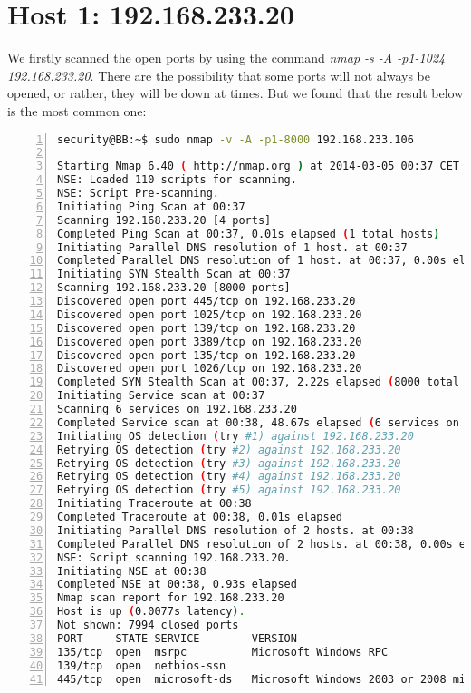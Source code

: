\section*{Host 1: 192.168.233.20}
\par We firstly scanned the open ports by using the command \textit{nmap -s -A -p1-1024 192.168.233.20}. There are the possibility that some ports will not always be opened, or rather, they will be down at times. But we found that the result below is the most common one:
\par \begin{lstlisting}[language=sh,numbers=left,numberstyle=\tiny,columns=fullflexible,basicstyle=\footnotesize\ttfamily, breaklines=true, breakautoindent=true, breakindent=4em]
security@BB:~$ sudo nmap -v -A -p1-8000 192.168.233.106

Starting Nmap 6.40 ( http://nmap.org ) at 2014-03-05 00:37 CET
NSE: Loaded 110 scripts for scanning.
NSE: Script Pre-scanning.
Initiating Ping Scan at 00:37
Scanning 192.168.233.20 [4 ports]
Completed Ping Scan at 00:37, 0.01s elapsed (1 total hosts)
Initiating Parallel DNS resolution of 1 host. at 00:37
Completed Parallel DNS resolution of 1 host. at 00:37, 0.00s elapsed
Initiating SYN Stealth Scan at 00:37
Scanning 192.168.233.20 [8000 ports]
Discovered open port 445/tcp on 192.168.233.20
Discovered open port 1025/tcp on 192.168.233.20
Discovered open port 139/tcp on 192.168.233.20
Discovered open port 3389/tcp on 192.168.233.20
Discovered open port 135/tcp on 192.168.233.20
Discovered open port 1026/tcp on 192.168.233.20
Completed SYN Stealth Scan at 00:37, 2.22s elapsed (8000 total ports)
Initiating Service scan at 00:37
Scanning 6 services on 192.168.233.20
Completed Service scan at 00:38, 48.67s elapsed (6 services on 1 host)
Initiating OS detection (try #1) against 192.168.233.20
Retrying OS detection (try #2) against 192.168.233.20
Retrying OS detection (try #3) against 192.168.233.20
Retrying OS detection (try #4) against 192.168.233.20
Retrying OS detection (try #5) against 192.168.233.20
Initiating Traceroute at 00:38
Completed Traceroute at 00:38, 0.01s elapsed
Initiating Parallel DNS resolution of 2 hosts. at 00:38
Completed Parallel DNS resolution of 2 hosts. at 00:38, 0.00s elapsed
NSE: Script scanning 192.168.233.20.
Initiating NSE at 00:38
Completed NSE at 00:38, 0.93s elapsed
Nmap scan report for 192.168.233.20
Host is up (0.0077s latency).
Not shown: 7994 closed ports
PORT     STATE SERVICE        VERSION
135/tcp  open  msrpc          Microsoft Windows RPC
139/tcp  open  netbios-ssn
445/tcp  open  microsoft-ds   Microsoft Windows 2003 or 2008 microsoft-ds

\end{lstlisting}
